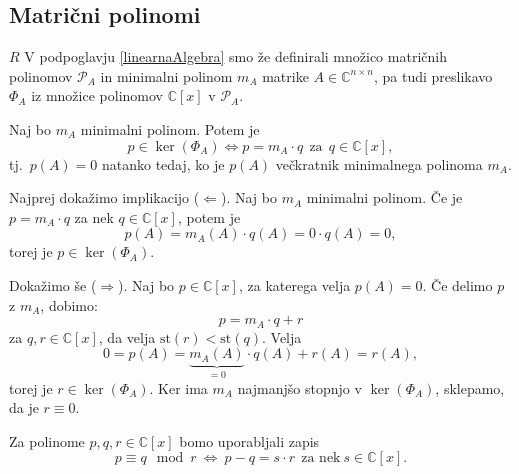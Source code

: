 \documentclass[mat1]{fmfdelo}
\newcommand{\C}{\mathbb C}
\begin{document}
\subsection{Matrični polinomi}
$R$
V podpoglavju \ref{linearnaAlgebra} smo že definirali množico matričnih polinomov $\mathcal{P}_A$ in minimalni polinom $m_A$ matrike $A \in \C^{n \times n}$, pa tudi preslikavo $\Phi_A$ iz množice polinomov $\C [x]$ v $\mathcal{P}_A$.
\begin{trditev}\label{trditevMinimalniPolinom}
    Naj bo $m_A$ minimalni polinom. Potem je
    \begin{equation}
        p \in \ker (\Phi_A) \Leftrightarrow p = m_A \cdot q\ \  \text{za}\ \ q \in \C [x],
    \end{equation}
    tj.\ $p(A) = 0$ natanko tedaj, ko je $p(A)$ večkratnik minimalnega polinoma $m_A$.
\end{trditev}
\begin{dokaz}
    Najprej dokažimo implikacijo ($\Leftarrow$). Naj bo $m_A$ minimalni polinom. Če je $p = m_A\cdot q$ za nek $q \in \C [x]$, potem je
    \begin{equation}
        p(A) = m_A(A) \cdot q(A) = 0 \cdot q(A) = 0,
    \end{equation}
    torej je $p \in \ker(\Phi_A)$.
    
    \noindent Dokažimo še ($\Rightarrow$). Naj bo $p \in \C [x]$, za katerega velja $p(A) = 0$. Če delimo $p$ z $m_A$, dobimo:
    \begin{equation*}
        p = m_A \cdot q + r
    \end{equation*}
    za $q, r \in \C [x]$, da velja $\text{st}(r) < \text{st}(q)$. Velja
    \begin{equation*}
        0 = p(A) = \underbrace{m_A(A)}_{=0} \cdot q(A) + r(A) = r(A),
    \end{equation*}
    torej je $r \in \ker(\Phi_A)$. Ker ima $m_A$ najmanjšo stopnjo v $\ker(\Phi_A)$, sklepamo, da je $r \equiv 0$.
\end{dokaz}
Za polinome $p, q, r \in \C [x]$ bomo uporabljali zapis
\begin{equation}
    p \equiv q \mod r\  \Longleftrightarrow\  p - q = s\cdot r\ \  \text{za nek}\  s\in \C [x].
\end{equation}
\end{document}
